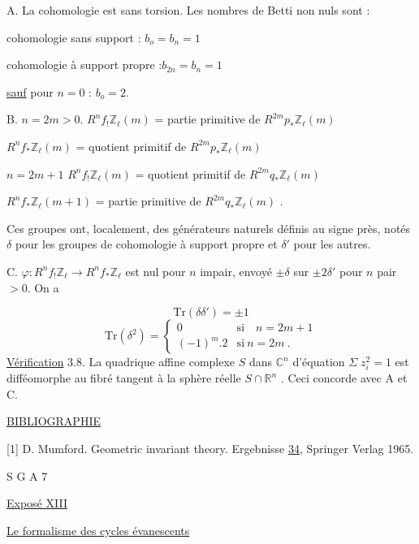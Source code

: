 A.  La cohomologie est sans torsion. Les nombres de Betti non nuls sont :

cohomologie sans support  :  $b_o = b_n = 1$

cohomologie à support propre :$b_{2n} = b_n = 1$

\underline{sauf} pour $n = 0$  :  $b_o = 2$.

B.  $n = 2m > 0$.  $R^n f_{!} \mathbb{Z}_\ell(m)$ = partie primitive de $R^{2m} p_{*} \mathbb{Z}_\ell(m)$

$R^n f_{*} \mathbb{Z}_\ell(m)$ = quotient primitif de $R^{2m} p_{*} \mathbb{Z}_\ell(m)$

$n = 2m + 1$   $R^n f_{!} \mathbb{Z}_\ell(m)$ = quotient primitif de $R^{2m} q_{*} \mathbb{Z}_\ell(m)$

$R^n f_{*} \mathbb{Z}_\ell(m+1)$ = partie primitive de $R^{2m} q_{*} \mathbb{Z}_\ell(m)$  .

Ces groupes ont, localement, des générateurs naturels définis au signe près, notés $\delta$ pour les groupes de cohomologie à support propre et $\delta'$ pour les autres.

C.  $\varphi : R^n f_{!} \mathbb{Z}_\ell \longrightarrow R^n f_{*} \mathbb{Z}_\ell$ est nul pour $n$ impair, envoyé $\pm \delta$ sur $\pm 2 \delta'$ pour $n$ pair $> 0$. On a

\begin{equation*}
\mathrm{Tr}(\delta\delta') = \pm 1
\end{equation*}
\begin{equation*}
\mathrm{Tr}(\delta^2) = \begin{cases} 0 & \text{si} \quad n = 2m + 1 \\ (-1)^m . 2 & \text{si} \ n = 2m \ . \end{cases}
\end{equation*}
\underline{Vérification} 3.8.  La quadrique affine complexe $S$ dans $\mathbb{C}^n$ d'équation $\Sigma \; z_i^2 = 1$ est difféomorphe au fibré tangent à la sphère réelle $S \cap \mathbb{R}^n$ .  Ceci concorde avec A et C.

\underline{BIBLIOGRAPHIE}

{[}1]  D. Mumford.  Geometric invariant theory. Ergebnisse \underline{34}, Springer Verlag 1965.




S G A  7


\underline{Exposé XIII}


\underline{Le formalisme des cycles évanescents}


